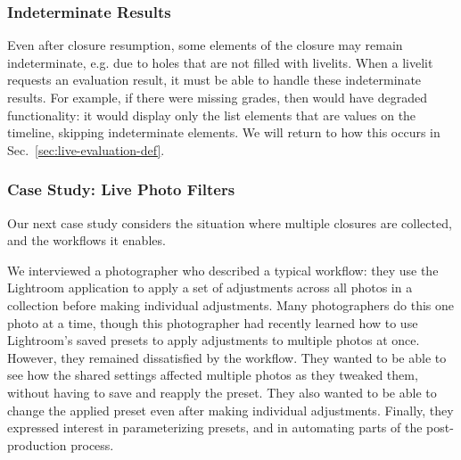 
\subsubsection{Indeterminate Results}
Even after closure resumption, some elements of the closure may remain indeterminate, e.g. due to holes that
are not filled with livelits.
When a livelit requests an evaluation result, it must be able to handle these indeterminate results.
For example, if there were missing grades,
then  would have degraded functionality:
it would display only the list elements that are values on the timeline, skipping indeterminate elements.
We will return to how this occurs in Sec.~\ref{sec:live-evaluation-def}.



\subsubsection{Case Study: Live Photo Filters}\label{sec:image-transformation}
Our next case study
considers the situation where multiple closures are collected, and
the workflows it enables.

We interviewed a photographer
who described a typical workflow:
they use the Lightroom application to
apply a set of adjustments
across all photos in a collection before making
individual adjustments.
Many photographers do this one photo at a time,
though this photographer had recently learned how to
use Lightroom's saved presets to
apply adjustments to multiple photos at once.
However, they remained dissatisfied by the workflow.
They wanted to be able to see how the shared settings affected
multiple photos as they tweaked them, without having to
save and reapply the preset.
They also wanted to be able to change the applied preset
even after making individual adjustments.
Finally, they
expressed interest in parameterizing
presets, and in automating parts of the post-production process.




